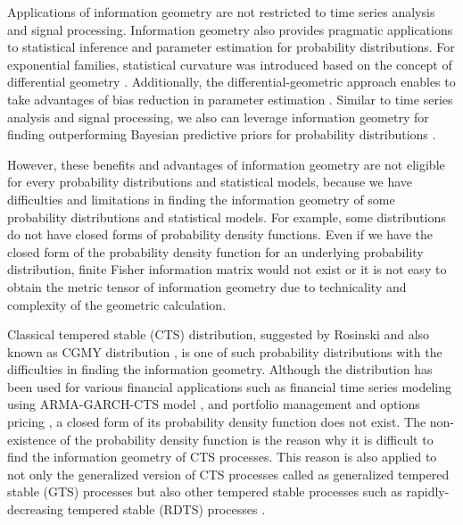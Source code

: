 \documentclass[preprint,11pt]{amsart}
\begin{document}
	Applications of information geometry are not restricted to time series analysis and signal processing. Information geometry also provides pragmatic applications to statistical inference and parameter estimation for probability distributions. For exponential families, statistical curvature was introduced based on the concept of differential geometry \cite{efron1975defining, efron1978geometry}. Additionally, the differential-geometric approach enables to take advantages of bias reduction in parameter estimation \cite{firth1993bias,kosmidis2009bias,kosmidis2010generic}. Similar to time series analysis and signal processing, we also can leverage information geometry for finding outperforming Bayesian predictive priors for probability distributions \cite{komaki2006shrinkage}. 
	
	However, these benefits and advantages of information geometry are not eligible for every probability distributions and statistical models, because we have difficulties and limitations in finding the information geometry of some probability distributions and statistical models. For example, some distributions do not have closed forms of probability density functions. Even if we have the closed form of the probability density function for an underlying probability distribution, finite Fisher information matrix would not exist or it is not easy to obtain the metric tensor of information geometry due to technicality and complexity of the geometric calculation.
	
	Classical tempered stable (CTS) distribution, suggested by Rosinski \cite{rosinski2007tempering} and also known as CGMY distribution \cite{carr2002fine}, is one of such probability distributions with the difficulties in finding the information geometry. Although the distribution has been used for various financial applications such as financial time series modeling using ARMA-GARCH-CTS model \cite{kim2009computing, kim2010tempered, kim2011time}, and portfolio management and options pricing \cite{tsuchida2012mean, beck2013empirical, choi2015reward, georgiev2015periodic, anand2017equity, kim2023deep, choi2024diversified}, a closed form of its probability density function does not exist. The non-existence of the probability density function is the reason why it is difficult to find the information geometry of CTS processes. This reason is also applied to not only the generalized version of CTS processes called as generalized tempered stable (GTS) processes \cite{rachev2011financial} but also other tempered stable processes such as rapidly-decreasing tempered stable (RDTS) processes \cite{kim2010tempered}.
	
\end{document}
